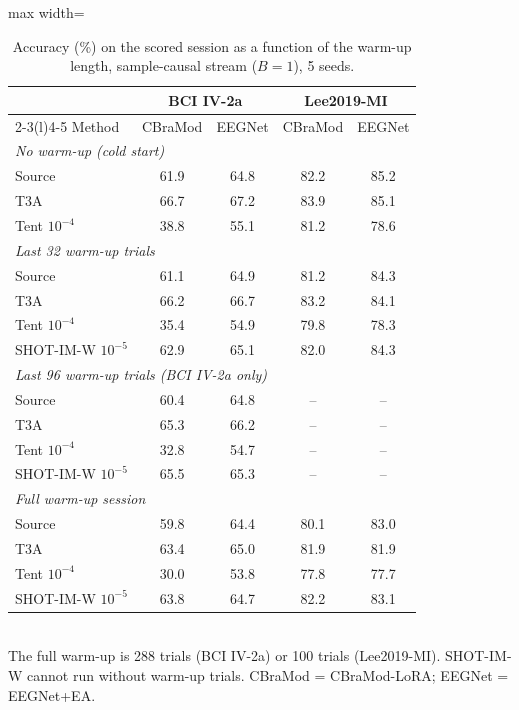 \documentclass[preprint,12pt]{elsarticle}
\newcommand{\revfloat}{}
\begin{document}
\begin{table}[!htbp]
\centering
\caption{Accuracy (\%) on the scored session as a function of the warm-up length, sample-causal stream ($B=1$), 5 seeds.}
\label{tab:warmup}
\revfloat
\setlength{\tabcolsep}{3pt}
\begin{adjustbox}{max width=\textwidth}
\begin{tabular}{@{}lcccc@{}}
\toprule
 & \multicolumn{2}{c}{BCI IV-2a} & \multicolumn{2}{c}{Lee2019-MI} \\
\cmidrule(lr){2-3}\cmidrule(l){4-5}
Method & CBraMod & EEGNet & CBraMod & EEGNet \\
\midrule
\multicolumn{5}{l}{\textit{No warm-up (cold start)}}\\
Source & 61.9 & 64.8 & 82.2 & 85.2 \\
T3A & 66.7 & 67.2 & 83.9 & 85.1 \\
Tent $10^{-4}$ & 38.8 & 55.1 & 81.2 & 78.6 \\
\midrule
\multicolumn{5}{l}{\textit{Last 32 warm-up trials}}\\
Source & 61.1 & 64.9 & 81.2 & 84.3 \\
T3A & 66.2 & 66.7 & 83.2 & 84.1 \\
Tent $10^{-4}$ & 35.4 & 54.9 & 79.8 & 78.3 \\
SHOT-IM-W $10^{-5}$ & 62.9 & 65.1 & 82.0 & 84.3 \\
\midrule
\multicolumn{5}{l}{\textit{Last 96 warm-up trials (BCI IV-2a only)}}\\
Source & 60.4 & 64.8 & -- & -- \\
T3A & 65.3 & 66.2 & -- & -- \\
Tent $10^{-4}$ & 32.8 & 54.7 & -- & -- \\
SHOT-IM-W $10^{-5}$ & 65.5 & 65.3 & -- & -- \\
\midrule
\multicolumn{5}{l}{\textit{Full warm-up session}}\\
Source & 59.8 & 64.4 & 80.1 & 83.0 \\
T3A & 63.4 & 65.0 & 81.9 & 81.9 \\
Tent $10^{-4}$ & 30.0 & 53.8 & 77.8 & 77.7 \\
SHOT-IM-W $10^{-5}$ & 63.8 & 64.7 & 82.2 & 83.1 \\
\bottomrule
\end{tabular}
\end{adjustbox}\\[2pt]
{\footnotesize The full warm-up is 288 trials (BCI IV-2a) or 100 trials (Lee2019-MI). SHOT-IM-W cannot run without warm-up trials. CBraMod = CBraMod-LoRA; EEGNet = EEGNet+EA.}
\end{table}
\end{document}
